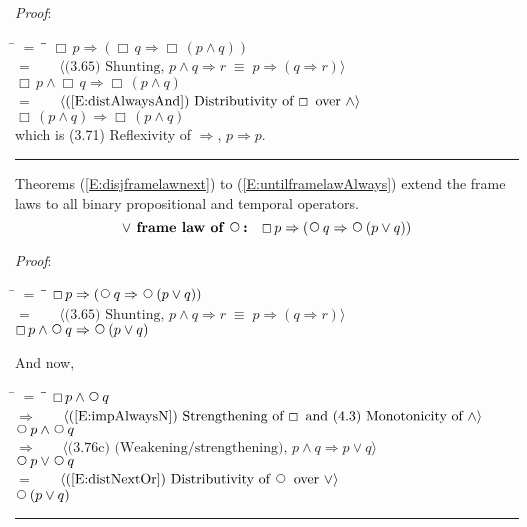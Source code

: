 \documentclass[12pt, fleqn, leqno]{article}
\newcommand{\lgap}{2pt}                             %
\newcommand{\mymathindent}{24pt}                    %
\newcommand{\equivs}{\ensuremath{\;\equiv\;}}       %
\newcommand{\impl}{\ensuremath{\Rightarrow}}        %
\newcommand{\Next}{\;\,\text{\raisebox{3.5pt}{\circle{6}}}}
\newcommand{\Always}{\Box\,}
\newcommand{\myqed}{\rule[-.23ex]{1.2ex}{2.0ex}}
\newcommand{\myqedtab}{\hspace{384pt}}              %
\newcommand{\Gll} {\langle}                         %
\newcommand{\Ggg} {\rangle}                         %
\newcommand{\Hint}[1]     {\ \ \ $\Gll              \mbox{#1} \Ggg$ }   %
\begin{document}
\emph{Proof}: 
\begin{tabbing}
\hspace{\mymathindent} \= $= \;$ \= \myqedtab \= \kill
  \> \>   $\Always p \impl (\Always q \impl \Always (p \land q))$\\[\lgap]
  \> $=$  \>  \Hint{(3.65) Shunting, $p\land q\impl r\equivs p\impl (q\impl r)$}\\[\lgap]
  \> \>   $\Always p \land \Always q \impl \Always (p \land q)$\\[\lgap]
  \> $=$  \>  \Hint{(\ref{E:distAlwaysAnd}) Distributivity of $\Always$ over $\land$}\\[\lgap]
  \> \>   $\Always (p \land q) \impl \Always (p \land q)$\\[\lgap]
   \> which is (3.71) Reflexivity of $\impl$, $p\impl p$. \quad \myqed
\end{tabbing}
Theorems (\ref{E:disjframelawnext}) to (\ref{E:untilframelawAlways}) extend the frame laws
to all binary propositional and temporal operators.
\begin{equation}\label{E:disjframelawnext}
\textbf{$\lor$ frame law of $\Next$:}\quad \Always p \impl (\Next q \impl \Next (p \lor q))
\end{equation}

\emph{Proof}:
\begin{tabbing}
\hspace{\mymathindent} \= $= \;$ \= \myqedtab \= \kill
  \> \>   $\Always p \impl (\Next q \impl \Next (p \lor q))$\\[\lgap]
  \> $=$  \>  \Hint{(3.65) Shunting, $p\land q\impl r\equivs p\impl (q\impl r)$}\\[\lgap]
  \> \>   $\Always p \land \Next q \impl \Next (p \lor q)$
\end{tabbing}
And now,
\begin{tabbing}
\hspace{\mymathindent} \= $= \;$ \= \myqedtab \= \kill
  \> \>   $\Always p \land \Next q $\\[\lgap]
  \> $\impl$  \>  \Hint{(\ref{E:impAlwaysN}) Strengthening of $\Always$ and (4.3) Monotonicity of $\land$}\\[\lgap]
  \> \>   $\Next p \land \Next q $\\[\lgap]
   \> $\impl$ \> \Hint{(3.76c) (Weakening/strengthening), $p\land q \impl p \lor q$} \\[\lgap]
   \> \>   $\Next p \lor \Next q $\\[\lgap]
  \> $=$  \>  \Hint{(\ref{E:distNextOr}) Distributivity of $\Next$ over $\lor$}\\[\lgap]
  \> \>   $\Next (p \lor q)$\quad \myqed
\end{tabbing}
\end{document}

